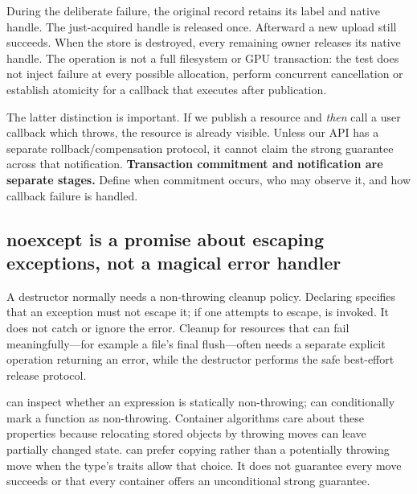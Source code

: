 During the deliberate failure, the original record retains its label and native handle. The just-acquired handle is released once. Afterward a new upload still succeeds. When the store is destroyed, every remaining owner releases its native handle. The operation is not a full filesystem or GPU transaction: the test does not inject failure at every possible allocation, perform concurrent cancellation or establish atomicity for a callback that executes after publication.

The latter distinction is important. If we publish a resource and \emph{then} call a user callback which throws, the resource is already visible. Unless our API has a separate rollback/compensation protocol, it cannot claim the strong guarantee across that notification. \textbf{Transaction commitment and notification are separate stages.} Define when commitment occurs, who may observe it, and how callback failure is handled.

\subsection{noexcept is a promise about escaping exceptions, not a magical error handler}\label{01-foundations-i-ch004-noexcept-is-a-promise-about-escaping-exceptions-not-a-magical-error-handler}

\hypertarget{01-foundations-i-ch004-noexcept-is-a-promise-about-escaping-exceptions-not-a-magical-error-handler}{}

A destructor normally needs a non-throwing cleanup policy. Declaring  specifies that an exception must not escape it; if one attempts to escape,  is invoked. It does not catch or ignore the error. Cleanup for resources that can fail meaningfully---for example a file's final flush---often needs a separate explicit operation returning an error, while the destructor performs the safe best-effort release protocol.

 can inspect whether an expression is statically non-throwing;  can conditionally mark a function as non-throwing. Container algorithms care about these properties because relocating stored objects by throwing moves can leave partially changed state.  can prefer copying rather than a potentially throwing move when the type's traits allow that choice. It does not guarantee every move succeeds or that every container offers an unconditional strong guarantee.


